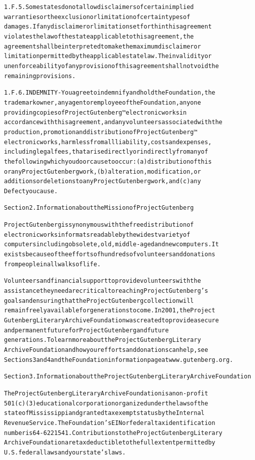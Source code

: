 \documentclass[12pt]{book}[2005/09/16]
\newenvironment{PGtext}{%
\begin{alltt}
\fontsize{9.2}{10.5}\ttfamily\selectfont}%
{\end{alltt}}
\begin{document}
\begin{PGtext}
1.F.5. Some states do not allow disclaimers of certain implied
warranties or the exclusion or limitation of certain types of
damages. If any disclaimer or limitation set forth in this agreement
violates the law of the state applicable to this agreement, the
agreement shall be interpreted to make the maximum disclaimer or
limitation permitted by the applicable state law. The invalidity or
unenforceability of any provision of this agreement shall not void the
remaining provisions.

1.F.6. INDEMNITY - You agree to indemnify and hold the Foundation, the
trademark owner, any agent or employee of the Foundation, anyone
providing copies of Project Gutenberg™ electronic works in
accordance with this agreement, and any volunteers associated with the
production, promotion and distribution of Project Gutenberg™
electronic works, harmless from all liability, costs and expenses,
including legal fees, that arise directly or indirectly from any of
the following which you do or cause to occur: (a) distribution of this
or any Project Gutenberg work, (b) alteration, modification, or
additions or deletions to any Project Gutenberg work, and (c) any
Defect you cause.

Section 2. Information about the Mission of Project Gutenberg

Project Gutenberg is synonymous with the free distribution of
electronic works in formats readable by the widest variety of
computers including obsolete, old, middle-aged and new computers. It
exists because of the efforts of hundreds of volunteers and donations
from people in all walks of life.

Volunteers and financial support to provide volunteers with the
assistance they need are critical to reaching Project Gutenberg’s
goals and ensuring that the Project Gutenberg collection will
remain freely available for generations to come. In 2001, the Project
Gutenberg Literary Archive Foundation was created to provide a secure
and permanent future for Project Gutenberg and future
generations. To learn more about the Project Gutenberg Literary
Archive Foundation and how your efforts and donations can help, see
Sections 3 and 4 and the Foundation information page at www.gutenberg.org.

Section 3. Information about the Project Gutenberg Literary Archive Foundation

The Project Gutenberg Literary Archive Foundation is a non-profit
501(c)(3) educational corporation organized under the laws of the
state of Mississippi and granted tax exempt status by the Internal
Revenue Service. The Foundation’s EIN or federal tax identification
number is 64-6221541. Contributions to the Project Gutenberg Literary
Archive Foundation are tax deductible to the full extent permitted by
U.S. federal laws and your state’s laws.


\end{PGtext}
\end{document}
